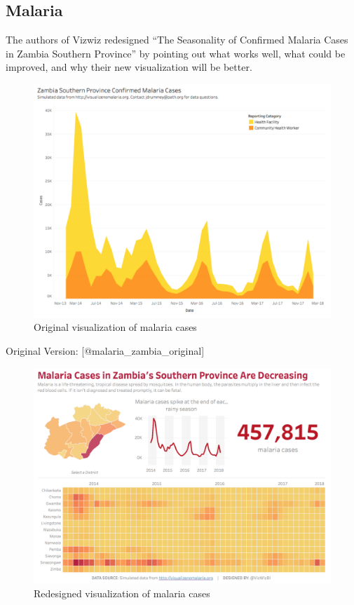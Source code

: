 \documentclass[]{book}
\theoremstyle{definition}
\theoremstyle{definition}
\theoremstyle{definition}
\theoremstyle{remark}
\begin{document}
\subsection{Malaria}\label{malaria}

The authors of Vizwiz redesigned ``The Seasonality of Confirmed Malaria
Cases in Zambia Southern Province'' by pointing out what works well,
what could be improved, and why their new visualization will be better.

\begin{figure}
\centering
\includegraphics{images/malaria_original.png}
\caption{Original visualization of malaria cases}
\end{figure}

Original Version: {[}@malaria\_zambia\_original{]}

\begin{figure}
\centering
\includegraphics{images/malaria_makeover.png}
\caption{Redesigned visualization of malaria cases}
\end{figure}
\end{document}
